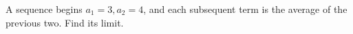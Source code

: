 A sequence begins $ a_1=3,a_2=4 $, and each subsequent term is the average of the previous two. Find its limit.
